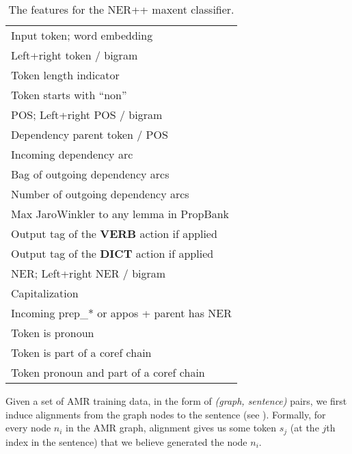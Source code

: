 \documentclass[11pt]{article}
\newcommand\w[1]{\textit{#1}} %
\begin{document}

%
%

\begin{table}[t]
\small
\begin{center}
\begin{tabular}{l}
Input token; word embedding                  \\
Left+right token / bigram                    \\
Token length indicator     \\
Token starts with ``non''     \\
POS; Left+right POS / bigram                 \\
Dependency parent token / POS                \\
Incoming dependency arc                      \\
Bag of outgoing dependency arcs              \\
Number of outgoing dependency arcs           \\
Max JaroWinkler to any lemma in PropBank      \\
Output tag of the \textbf{VERB} action if applied \\
Output tag of the \textbf{DICT} action if applied \\
NER; Left+right NER / bigram                 \\
Capitalization                               \\
Incoming prep\_* or appos + parent has NER   \\
Token is pronoun                             \\
Token is part of a coref chain               \\
Token pronoun and part of a coref chain     \\
\end{tabular}
\end{center}
\caption{\label{tab:features} The features for the NER++ maxent classifier. }
\end{table}

Given a set of AMR training data, in the form of \w{(graph, sentence)} pairs,
  we first induce alignments from the graph nodes to the sentence 
  (see ).
Formally, for every node $n_i$ in the AMR graph, alignment gives us some token $s_j$ (at the $j$th index in the sentence) that we believe generated the node $n_i$.
\end{document}
